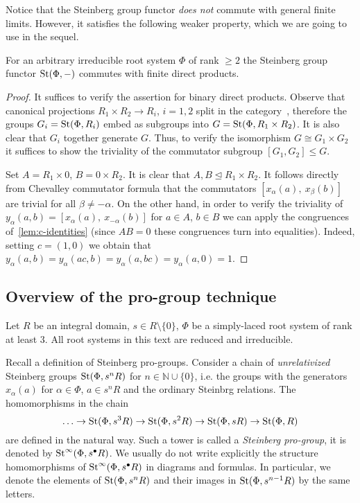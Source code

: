 \documentclass[oneside, 11pt]{amsart} \pdfoutput=1
\begin{document}
Notice that the Steinberg group functor {\it does not} commute with general finite limits. However, it satisfies the following weaker property, which we are going to use in the sequel.
\begin{lemma} \label{lem:fprod} For an arbitrary irreducible root system $\Phi$ of rank $\geq 2$ the Steinberg group functor $\mathop{\mathrm{St}}\nolimits(\Phi, -)$ commutes with finite direct products. \end{lemma}
\begin{proof} 
It suffices to verify the assertion for binary direct products.
Observe that canonical projections $R_1 \times R_2 \to R_i$, $i=1,2$ split in the category~, therefore the groups $G_i = \mathop{\mathrm{St}}\nolimits(\Phi, R_i)$ embed as subgroups into $G = \mathop{\mathrm{St}}\nolimits(\Phi, R_1 \times R_2)$. It is also clear that $G_i$ together generate $G$. Thus, to verify the isomorphism $G \cong G_1 \times G_2$ it suffices to show the triviality of the commutator subgroup $[G_1, G_2] \leq G$.

Set $A = R_1\times 0$, $B = 0 \times R_2$. It is clear that $A, B \trianglelefteq R_1 \times R_2$. 
It follows directly from Chevalley commutator formula that the commutators $[x_{\alpha}(a),\ x_\beta(b)]$ are trivial for all $\beta \neq -\alpha$. On the other hand, in order to verify the triviality of $y_\alpha(a, b) = [x_{\alpha}(a),\ x_{-\alpha}(b)]$ for $a\in A$, $b\in B$ we can apply the congruences of~\cref{lem:c-identities} (since $AB=0$ these congruences turn into equalities).
Indeed, setting $c = (1, 0)$ we obtain that $y_\alpha(a, b) = y_\alpha(ac, b) = y_\alpha(a, bc) = y_\alpha(a, 0) = 1$. \end{proof}

\subsection{Overview of the pro-group technique}
Let $R$ be an integral domain, $s \in R \setminus \{0\}$, $\Phi$ be a simply-laced root system of rank at least $3$. All root systems in this text are reduced and irreducible.

Recall a definition of Steinberg pro-groups. Consider a chain of {\it unrelativized} Steinberg groups $\mathop{\mathrm{St}}\nolimits(\Phi, s^n R)$ for $n \in \mathbb N \cup \{0\}$, i.e. the groups with the generators $x_{\alpha}(a)$ for $\alpha \in \Phi$, $a \in s^n R$ and the ordinary Steinbrg relations. The homomorphisms in the chain
$$
\ldots \to \mathop{\mathrm{St}}\nolimits(\Phi, s^3 R) \to \mathop{\mathrm{St}}\nolimits(\Phi, s^2 R) \to \mathop{\mathrm{St}}\nolimits(\Phi, s R) \to \mathop{\mathrm{St}}\nolimits(\Phi, R)
$$
are defined in the natural way. Such a tower is called a {\it Steinberg pro-group}, it is denoted by $\mathop{\mathrm{St}}\nolimits^\infty(\Phi, s^\bullet R)$. We usually do not write explicitly the structure homomorphisms of $\mathop{\mathrm{St}}\nolimits^\infty(\Phi, s^\bullet R)$ in diagrams and formulas. In particular, we denote the elements of $\mathop{\mathrm{St}}\nolimits(\Phi, s^n R)$ and their images in $\mathop{\mathrm{St}}\nolimits(\Phi, s^{n - 1} R)$ by the same letters.
\end{document}
